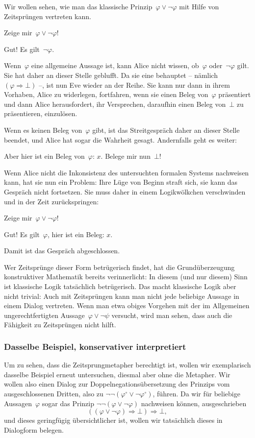 \documentclass[a4paper,ngerman,12pt]{scrartcl}
\theoremstyle{definition}
\theoremstyle{plain}
\theoremstyle{remark}
\renewcommand{\_}{\mathpunct{.}\,}
\newcommand{\?}{\,{:}\,}
\newcommand{\Alice}{\item[Alice]}
\newcommand{\Eve}{\item[Eve]}
\newenvironment{dialogue}{%
  \begin{list}{}{%
    \settowidth{\labelwidth}{\qquad\emph{Alice:}}
    \setlength{\labelsep}{0.3cm}
    \setlength{\leftmargin}{\labelwidth}
    \addtolength{\leftmargin}{\labelsep}
    \setlength{\rightmargin}{0pt}
    \setlength{\parsep}{0.5ex plus 0.2ex minus 0.1ex}
    \setlength{\itemsep}{0 ex plus 0.2ex}
    \renewcommand{\makelabel}[1]{\qquad\emph{##1:}\hfil}
    }
}{\end{list}}
\begin{document}
Wir wollen sehen, wie man das klassische Prinzip~$\varphi \vee
\neg\varphi$ mit Hilfe von Zeitsprüngen vertreten kann.
\begin{dialogue}
\Eve Zeige mir~$\varphi \vee \neg\varphi$!
\Alice Gut! Es gilt~$\neg\varphi$.
\end{dialogue}
Wenn~$\varphi$ eine allgemeine Aussage ist, kann Alice nicht wissen,
ob~$\varphi$ oder~$\neg\varphi$ gilt. Sie hat daher an dieser Stelle geblufft.
Da sie eine behauptet -- nämlich~$(\varphi \Rightarrow \bot)$ --, ist nun Eve
wieder an der Reihe. Sie kann nur dann in ihrem Vorhaben, Alice zu widerlegen,
fortfahren, wenn sie einen Beleg von~$\varphi$ präsentiert und dann Alice
herausfordert, ihr Versprechen, daraufhin einen Beleg von~$\bot$ zu
präsentieren, einzulösen.

Wenn es keinen Beleg von~$\varphi$ gibt, ist das Streitgespräch daher an dieser
Stelle beendet, und Alice hat sogar die Wahrheit gesagt. Andernfalls geht es
weiter:
\begin{dialogue}
\Eve Aber hier ist ein Beleg von~$\varphi$: $x$. Belege mir nun~$\bot$!
\end{dialogue}
Wenn Alice nicht die Inkonsistenz des untersuchten formalen Systems nachweisen
kann, hat sie nun ein Problem: Ihre Lüge von Beginn straft sich, sie kann das
Gespräch nicht fortsetzen. Sie muss daher in einem Logikwölkchen verschwinden
und in der Zeit zurückspringen:
\begin{dialogue}
\Eve Zeige mir~$\varphi \vee \neg\varphi$!
\Alice Gut! Es gilt~$\varphi$, hier ist ein Beleg: $x$.
\end{dialogue}
Damit ist das Gespräch abgeschlossen.

Wer Zeitsprünge dieser Form betrügerisch findet, hat die
Grund\-über\-zeu\-gung konstruktiver Mathematik bereits verinnerlicht: In diesem (und
nur diesem) Sinn ist klassische Logik tatsächlich betrügerisch. Das macht
klassische Logik aber nicht trivial: Auch mit Zeitsprüngen kann man nicht jede
beliebige Aussage in einem Dialog vertreten. Wenn man etwa obiges Vorgehen
mit der im Allgemeinen ungerechtfertigten Aussage~$\varphi \vee \neg\psi$
versucht, wird man sehen, dass auch die Fähigkeit zu Zeitsprüngen
nicht hilft.


\subsubsection*{Dasselbe Beispiel, konservativer interpretiert}

Um zu sehen, dass die Zeitsprungmetapher berechtigt ist, wollen wir
exemplarisch dasselbe Beispiel erneut untersuchen, diesmal aber ohne die
Metapher. Wir wollen also einen
Dialog zur
Dop\-pel\-ne\-ga\-tions\-über\-set\-zung des Prinzips vom ausgeschlossenen
Dritten, also zu $\neg\neg(\varphi^\circ \vee \neg\varphi^\circ)$, führen. Da wir
für beliebige Aussagen~$\varphi$ sogar das Prinzip $\neg\neg(\varphi \vee
\neg\varphi)$ nachweisen können, ausgeschrieben
\[ ((\varphi \vee \neg\varphi) \Rightarrow \bot) \Rightarrow \bot, \]
und dieses geringfügig übersichtlicher ist, wollen wir tatsächlich dieses in Dialogform
belegen.
\end{document}
